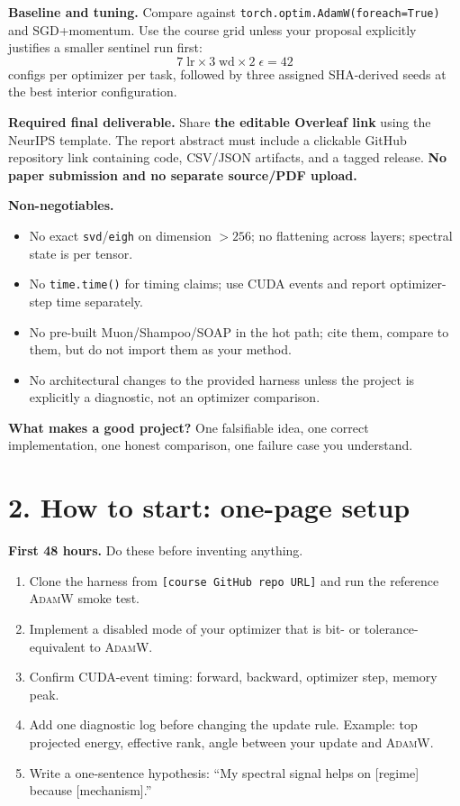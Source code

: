 \documentclass[10pt]{article}
\newcommand{\AdamW}{\textsc{AdamW}}
\newcommand{\repo}{\texttt{[course GitHub repo URL]}}
\begin{document}
\textbf{Baseline and tuning.} Compare against \texttt{torch.optim.AdamW(foreach=True)} and SGD+momentum. Use the course grid unless your proposal explicitly justifies a smaller sentinel run first:
\[
7\;\text{lr} \times 3\;\text{wd} \times 2\;\epsilon = 42
\]
configs per optimizer per task, followed by three assigned SHA-derived seeds at the best interior configuration.

\textbf{Required final deliverable.} Share \textbf{the editable Overleaf link} using the NeurIPS template. The report abstract must include a clickable GitHub repository link containing code, CSV/JSON artifacts, and a tagged release. \textbf{No paper submission and no separate source/PDF upload.}

\textbf{Non-negotiables.}
\begin{itemize}
  \item No exact \texttt{svd}/\texttt{eigh} on dimension $>256$; no flattening across layers; spectral state is per tensor.
  \item No \texttt{time.time()} for timing claims; use CUDA events and report optimizer-step time separately.
  \item No pre-built Muon/Shampoo/SOAP in the hot path; cite them, compare to them, but do not import them as your method.
  \item No architectural changes to the provided harness unless the project is explicitly a diagnostic, not an optimizer comparison.
\end{itemize}

\vfill
\textbf{What makes a good project?} One falsifiable idea, one correct implementation, one honest comparison, one failure case you understand.

\clearpage
\thispagestyle{empty}

\section*{2. How to start: one-page setup}

\textbf{First 48 hours.} Do these before inventing anything.
\begin{enumerate}
  \item Clone the harness from \repo{} and run the reference \AdamW{} smoke test.
  \item Implement a disabled mode of your optimizer that is bit- or tolerance-equivalent to \AdamW{}.
  \item Confirm CUDA-event timing: forward, backward, optimizer step, memory peak.
  \item Add one diagnostic log before changing the update rule. Example: top projected energy, effective rank, angle between your update and \AdamW{}.
  \item Write a one-sentence hypothesis: ``My spectral signal helps on [regime] because [mechanism].''
\end{enumerate}
\end{document}

